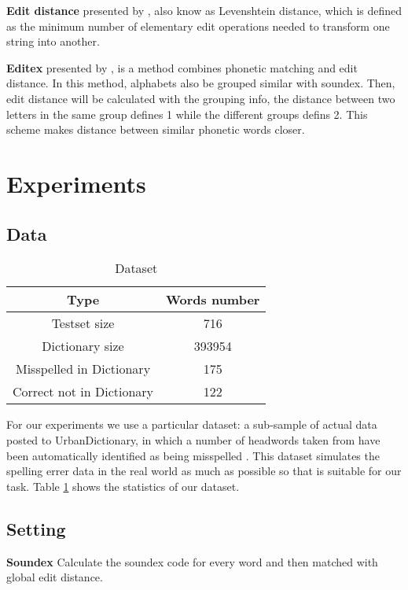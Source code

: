 \documentclass[11pt]{article}
\begin{document}
\noindent\textbf{Edit distance} presented by \cite{Levenshtein1965Binary},  also know as Levenshtein distance, which is defined as the minimum number of elementary edit operations needed to transform one string into another.

\noindent\textbf{Editex} presented by \cite{Zobel1996PhoneticSM}, is a method combines phonetic matching and edit distance. In this method, alphabets also be grouped similar with soundex. Then, edit distance will be calculated with the grouping info, the distance between two letters in the same group defines 1 while the different groups defins 2. This scheme makes distance between similar phonetic words closer.


\section{Experiments}

\subsection{Data} 

\begin{table}
	\centering
	\begin{tabular}{c|c}
		\hline
		\textbf{Type} & \textbf{Words number} \\
		\hline
		Testset size & 716 \\
		\hline
		Dictionary  size & 393954 \\
		\hline
		Misspelled in Dictionary & 175 \\
		\hline
		Correct not in Dictionary & 122 \\
		\hline
	\end{tabular}
	\caption{Dataset}
	\label{tab:dataset}
\end{table}

For our experiments we use a particular dataset:  a sub-sample of actual data posted to UrbanDictionary, in which a number of headwords taken from have been automatically identified as being misspelled \cite{Saphra2016EvaluatingIW}. This dataset simulates the spelling errer data in the real world as much as possible so that is suitable for our task. Table \ref{tab:dataset} shows the statistics of our dataset.

\subsection{Setting} 

\noindent\textbf{Soundex} Calculate the soundex code for every word and then matched with global edit distance.
\end{document}
